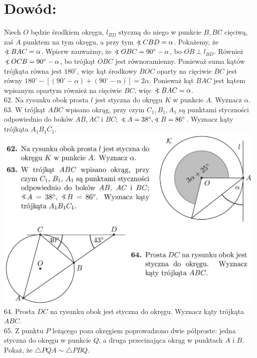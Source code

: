 \documentclass[10pt]{article}
\newcommand\Varangle{\mathop{{<\!\!\!\!\!\text{\small)}}\:}\nolimits}
\begin{document}
\section*{Dowód:}
Niech \(O\) będzie środkiem okręgu, \(l_{B D}\) styczną do niego w punkcie \(B, B C\) cięciwą, zaś \(A\) punktem na tym okręgu, a przy tym \(\Varangle C B D=\alpha\). Pokażemy, że \(\Varangle B A C=\alpha\). Wpierw zauważmy, że \(\Varangle O B C=90^{\circ}-\alpha\), bo \(\overline{O B} \perp l_{B D}\). Również \(\Varangle O C B=90^{\circ}-\alpha\), bo trójkąt \(O B C\) jest równoramienny. Ponieważ suma kątów trójkąta równa jest \(180^{\circ}\), więc kąt środkowy \(B O C\) oparty na cięciwie \(B C\) jest równy \(180^{\circ}-\left[\left(90^{\circ}-\alpha\right)+\left(90^{\circ}-\alpha\right)\right]=2 \alpha\). Ponieważ kąt \(B A C\) jest kątem wpisanym opartym również na cięciwie \(B C\), więc \(\Varangle B A C=\alpha\).\\
62. Na rysunku obok prosta \(l\) jest styczna do okręgu \(K\) w punkcie \(A\). Wyznacz \(\alpha\).\\
63. W trójkąt \(A B C\) wpisano okrąg, przy czym \(C_{1}, B_{1}, A_{1}\) są punktami styczności odpowiednio do boków \(A B, A C\) i \(B C\); \(\Varangle A=38^{\circ}, \Varangle B=86^{\circ}\). Wyznacz kąty trójkąta \(A_{1} B_{1} C_{1}\).\\
\includegraphics[max width=\textwidth, center]{2024_11_21_e9b4faa005d5be2cc318g-044}\\
64. Prosta \(D C\) na rysunku obok jest styczna do okręgu. Wyznacz kąty trójkąta \(A B C\).\\
65. Z punktu \(P\) leżącego poza okręgiem poprowadzono dwie półproste: jedna styczna do okręgu w punkcie \(Q\), a druga przecinająca okrąg w punktach \(A\) i \(B\). Pokaż, że \(\triangle P Q A \sim \triangle P B Q\).\\
\end{document}
